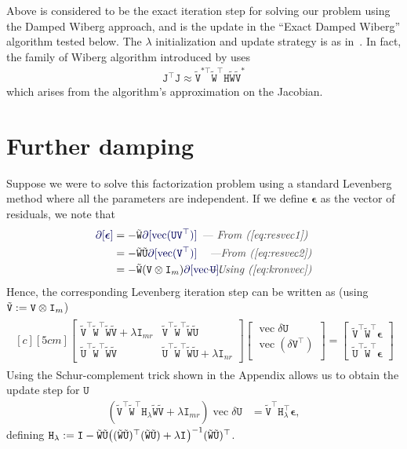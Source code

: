 \documentclass[runningheads]{llncs}
\def\eqref#1{(\ref{eq:#1})}
\def\tr{^\top}
\def\xcomment#1{\textcolor[gray]{.2}{\text{\em---#1}}}
\def\comment#1{\kern-1cm\xcomment{#1}}
\def\vec{\operatorname{vec}}
\def\m#1{\ensuremath{\mathtt{#1}}}
\def\mU{\m U}
\def\mV{\m V}
\def\mW{\m W}
\def\verr{\boldsymbol \epsilon}
\def\twiddle#1{{\tilde{#1}}}
\def\tU{\twiddle\mU}
\def\tW{\twiddle\mW}
\def\tV{\twiddle\mV}
\begin{document}
Above is considered to be the exact iteration step for solving our problem using the Damped Wiberg approach, and is the update in the ``Exact Damped Wiberg'' algorithm tested below.   The $\lambda$ initialization and update strategy is as in~\cite{okatani2006wiberg}.  In fact, the family of Wiberg algorithm introduced by \cite{okatani2006wiberg} uses 
\begin{align}
\m J \tr \m J \approx \tilde{\m V}^{*\top} \tW \tr \m H \tW \tV^*
\end{align}
which arises from the algorithm's approximation on the Jacobian.

\section{Further damping}
Suppose we were to solve this factorization problem using a standard Levenberg method where all the parameters are independent. If we define $ \verr $ as the vector of residuals, we note that
\begin{align}
\diff[\verr] &= - \tW \diff[\vec(\m U \m V \tr)] & \comment{ From \eqref{resvec1} }
\\ &= - \tW \tU \diff[\vec (\m V \tr)] & \comment{From \eqref{resvec2}}
\\ &= - \tW (\kron{\m V}{\m I_m}) \diff[\vec \m U].
& \comment{Using \eqref{kronvec}}
\end{align}
Hence, the corresponding Levenberg iteration step can be written as (using $\tV:=\kron{\mV}{\Id m}$)
\begin{align}
\begin{multlined}[c][5cm]
\begin{bmatrix}
\tV \tr \tW \tr \tW \tV + \lambda \m I_{mr} &
\tV \tr \tW \tr \tW \tU \\
\tU \tr \tW \tr \tW \tV &
\tU \tr \tW \tr \tW \tU + \lambda \m I_{nr}
\end{bmatrix}
\begin{bmatrix}
\vec \delta \m U \\
\vec (\delta \m V \tr) \\
\end{bmatrix} =
\begin{bmatrix}
\tV \tr \tW \tr \verr \\
\tU \tr \tW \tr \verr
\end{bmatrix}
\end{multlined}
\end{align}
Using the Schur-complement trick shown in the Appendix allows us to obtain the update step for $\m U$
\begin{align}
\left( \tV \tr \tW \tr \m H_\lambda \tW \tV + \lambda \m I_{mr} \right)
\vec {\delta \m U} &= \tV \tr \m H_\lambda \tr \verr,
\end{align}
defining $\m H_\lambda := 
\m I - \tW \tU \bigl((\tW \tU)\tr(\tW \tU)+\lambda\Id{}\bigr)^{-1}(\tW \tU)\tr$.
\end{document}
